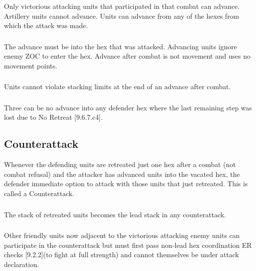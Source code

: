 \subsubsection{}
Only victorious attacking units that participated in that combat can advance. Artillery units cannot advance. Units can advance from any of the hexes from which the attack was made.

\subsubsection{}
The advance must be into the hex that was attacked. Advancing units ignore enemy ZOC to enter the hex. Advance after combat is not movement and uses no movement points.

\subsubsection{}
Units cannot violate stacking limits at the end of an advance after combat.

\subsubsection{}
Three can be no advance into any defender hex where the last remaining step was lost due to No Retreat [9.6.7.c4].

\subsection{Counterattack}

Whenever the defending units are retreated just one hex after a combat (not combat refusal) and the attacker has advanced units into the vacated hex, the defender immediate option to attack with those units that just retreated. This is called a Counterattack.

\subsubsection{}The stack of retreated units becomes the lead stack in any counterattack.

\subsubsection{}
Other friendly units now adjacent to the victorious attacking enemy units can participate in the counterattack but must first pass non-lead hex coordination ER checks [9.2.2](to fight at full strength) and cannot themselves be under attack declaration.

